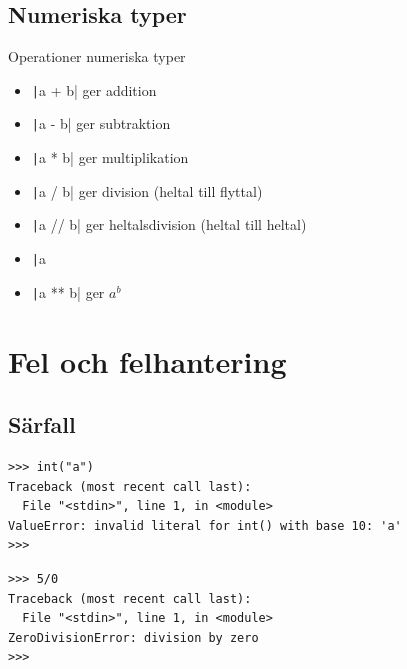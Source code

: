 \subsection{Numeriska typer}

\begin{frame}[fragile]
  \begin{block}{Operationer numeriska typer}
    \begin{itemize}
      \item \texttt|a + b| ger addition
      \item \texttt|a - b| ger subtraktion
      \item \texttt|a * b| ger multiplikation
      \item \texttt|a / b| ger division (heltal till flyttal)
      \item \texttt|a // b| ger heltalsdivision (heltal till heltal)
      \item \texttt|a %
      \item \texttt|a ** b| ger \(a^b\)
    \end{itemize}
  \end{block}
\end{frame}


\section{Fel och felhantering}

\subsection{Särfall}

\begin{frame}[fragile]
  \begin{example}
    \begin{verbatim}
>>> int("a")
Traceback (most recent call last):
  File "<stdin>", line 1, in <module>
ValueError: invalid literal for int() with base 10: 'a'
>>> 
    \end{verbatim}
  \end{example}
\end{frame}

\begin{frame}[fragile]
  \begin{example}
    \begin{verbatim}
>>> 5/0
Traceback (most recent call last):
  File "<stdin>", line 1, in <module>
ZeroDivisionError: division by zero
>>> 
    \end{verbatim}
  \end{example}
\end{frame}


